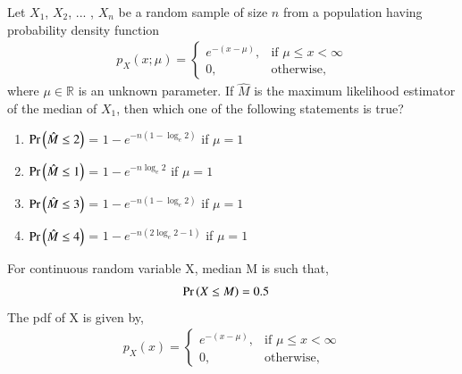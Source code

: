 \documentclass[]{article}
\theoremstyle{remark}
\begin{document}
\providecommand{\qfunc}[1]{\ensuremath{Q\left(#1\right)}}
\providecommand{\gauss}[2]{\mathcal{N}\ensuremath{\left(#1,#2\right)}}
\providecommand{\diff}[2]{\ensuremath{\frac{d{#1}}{d{#2}}}}
\providecommand{\myceil}[1]{\left \lceil #1 \right \rceil }
\newcommand\figref{Fig.~\ref}
\newcommand\tabref{Table~\ref}
\newcommand{\sinc}{\,\text{sinc}\,}
\newcommand{\rect}{\,\text{rect}\,}

\let\vec\mathbf

Let $X_1$, $X_2$, ... , $X_n$ be a random sample of size $n$ from a population having probability density function
\begin{align}
p_X(x; \mu) =
\begin{cases}
e^{-(x-\mu)}, & \text{if } \mu \leq x < \infty \\
0, & \text{otherwise,} 
\end{cases}
\end{align}
where $\mu \in \mathbb{R}$ is an unknown parameter. If $\hat{M}$ is the maximum likelihood estimator of the median of $X_1$, then which one of the following statements is true?
\begin{enumerate}[label=\Alph*)]
  \item $\Pr\left(\hat{M} \leq 2\right)$ = $1 - e^{-n(1-\log_e 2)}$ if $\mu = 1$
  \item $\Pr\left(\hat{M} \leq 1\right)$ = $1 - e^{-n \log_e 2}$ if $\mu = 1$
  \item $\Pr\left(\hat{M} \leq 3\right)$ = $1 - e^{-n(1-\log_e 2)}$ if $\mu = 1$
  \item $\Pr\left(\hat{M} \leq 4\right)$ = $1 - e^{-n(2\log_e 2-1)}$ if $\mu = 1$
\end{enumerate}
\fi
\solution
For continuous random variable X, median M is such that,
\begin{align}
\Pr\left(X \leq M\right) &= 0.5
\end{align}
The pdf of X is given by,
\begin{align}
p_X(x) =
\begin{cases}
e^{-(x-\mu)}, & \text{if } \mu \leq x < \infty \\
0, & \text{otherwise,} 
\end{cases}
\label{eq:391}
\end{align}
\end{document}
